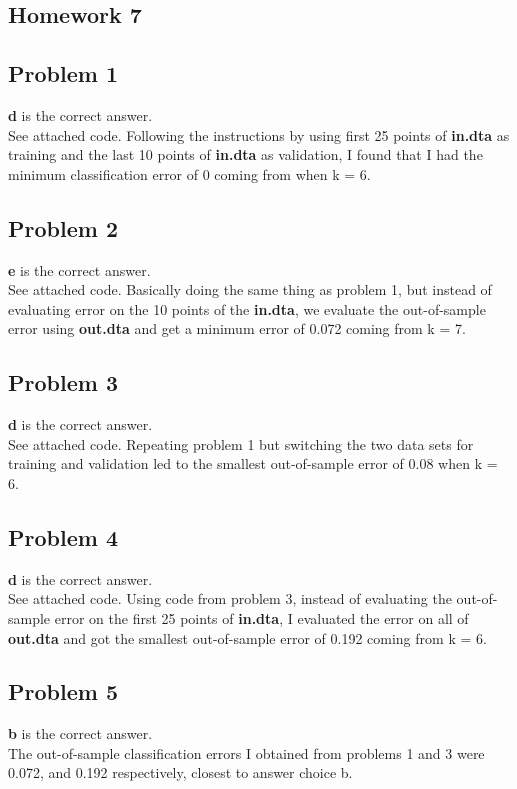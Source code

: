 \documentclass[12 pt]{article}
\begin{document}
	\begin{center}
		\section*{Homework 7}
	\end{center}
	
	
	\subsection*{Problem 1}	
	\textbf{d} is the correct answer. \\
	See attached code. Following the instructions by using first 25 points of \textbf{in.dta} as training and the last 10 points of \textbf{in.dta} as validation, I found that I had the minimum classification error of 0 coming from when k = 6.

	
	\subsection*{Problem 2}
	\textbf{e} is the correct answer. \\
	See attached code. Basically doing the same thing as problem 1, but instead of evaluating error on the 10 points of the \textbf{in.dta}, we evaluate the out-of-sample error using \textbf{out.dta} and get a minimum error of 0.072 coming from k = 7.
	
	\subsection*{Problem 3}
	\textbf{d} is the correct answer.\\
	See attached code. Repeating problem 1 but switching the two data sets for training and validation led to the smallest out-of-sample error of 0.08 when k = 6.
	 
	\subsection*{Problem 4}
	\textbf{d} is the correct answer.\\
	See attached code. Using code from problem 3, instead of evaluating the out-of-sample error on the first 25 points of \textbf{in.dta}, I evaluated the error on all of \textbf{out.dta} and got the smallest out-of-sample error of 0.192 coming from k = 6.

	\subsection*{Problem 5}
	\textbf{b} is the correct answer.\\
	The out-of-sample classification errors I obtained from problems 1 and 3 were 0.072, and 0.192 respectively, closest to answer choice b.
		
\end{document}
